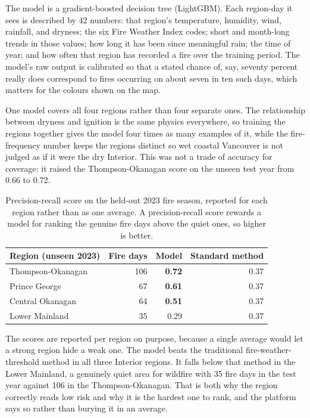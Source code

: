 \documentclass[11pt]{article}
\begin{document}
The model is a gradient-boosted decision tree (LightGBM). Each region-day it
sees is described by 42 numbers: that region's temperature, humidity, wind,
rainfall, and dryness; the six Fire Weather Index codes; short and month-long
trends in those values; how long it has been since meaningful rain; the time of
year; and how often that region has recorded a fire over the training period.
The model's raw output is calibrated so that a stated chance of, say, seventy
percent really does correspond to fires occurring on about seven in ten such
days, which matters for the colours shown on the map.

One model covers all four regions rather than four separate ones. The
relationship between dryness and ignition is the same physics everywhere, so
training the regions together gives the model four times as many examples of it,
while the fire-frequency number keeps the regions distinct so wet coastal
Vancouver is not judged as if it were the dry Interior. This was not a trade of
accuracy for coverage: it raised the Thompson-Okanagan score on the unseen test
year from 0.66 to 0.72.

\begin{table}[h]
\centering
\small
\begin{tabular}{@{}L{5.4cm}r r r@{}}
\toprule
\textbf{Region (unseen 2023)} & \textbf{Fire days} & \textbf{Model} & \textbf{Standard method} \\
\midrule
Thompson-Okanagan & 106 & \textbf{0.72} & 0.37 \\
Prince George & 67 & \textbf{0.61} & 0.37 \\
Central Okanagan & 64 & \textbf{0.51} & 0.37 \\
Lower Mainland & 35 & 0.29 & 0.37 \\
\bottomrule
\end{tabular}
\caption{Precision-recall score on the held-out 2023 fire season, reported for
each region rather than as one average. A precision-recall score rewards a model
for ranking the genuine fire days above the quiet ones, so higher is better.}
\end{table}

The scores are reported per region on purpose, because a single average would
let a strong region hide a weak one. The model beats the traditional
fire-weather-threshold method in all three Interior regions. It falls below that
method in the Lower Mainland, a genuinely quiet area for wildfire with 35 fire
days in the test year against 106 in the Thompson-Okanagan. That is both why the
region correctly reads low risk and why it is the hardest one to rank, and the
platform says so rather than burying it in an average.
\end{document}
